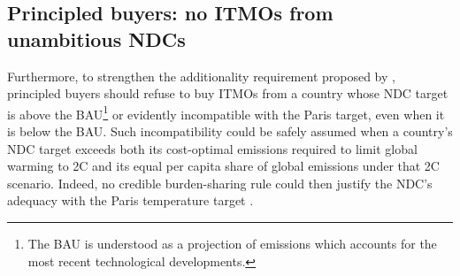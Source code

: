 \documentclass[12pt,english]{article}
\begin{document}
\subsection{Principled buyers: no ITMOs from unambitious NDCs} %
Furthermore, to strengthen the additionality requirement proposed by \cite{michaelowa_additionality_2019}, %
principled buyers should refuse to buy ITMOs from a country whose NDC target is above the BAU\footnote{The BAU is understood as a projection of emissions which accounts for the most recent technological developments.} 
or evidently incompatible with the Paris target, even when it is below the BAU.
Such incompatibility could be safely assumed when a country's NDC target exceeds both its cost-optimal emissions required to limit global warming to 2\textdegree{}C and its equal per capita share of global emissions under that 2\textdegree{}C scenario. %
Indeed, no credible burden-sharing rule could then justify the NDC's adequacy with the Paris temperature target %
 \citep{van_den_berg_implications_2020,robiou_du_pont_equitable_2017,hohne_regional_2014}. %
\end{document}
